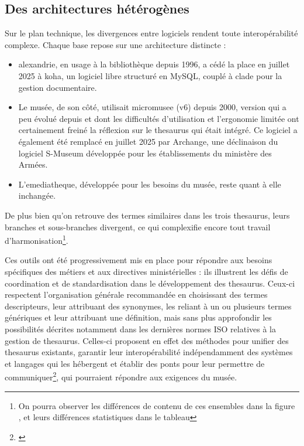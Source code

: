\subsection{Des architectures hétérogènes}

Sur le plan technique, les divergences entre logiciels rendent toute interopérabilité complexe. Chaque base repose sur une architecture distincte :
\begin{itemize}
	\item \gls{alexandrie}, en usage à la bibliothèque depuis 1996, a cédé la place en juillet 2025 à \gls{koha}, un logiciel libre structuré en MySQL, couplé à \gls{clade} pour la gestion documentaire.
	\item Le musée, de son côté, utilisait \gls{micromusee} (v6) depuis 2000, version qui a peu évolué depuis et dont les difficultés d'utilisation et l'ergonomie limitée ont certainement freiné la réflexion sur le \gls{thesaurus} qui était intégré. Ce logiciel a également été remplacé en juillet 2025 par Archange, une déclinaison du logiciel S-Museum développée pour les établissements du ministère des Armées.
	\item L'\gls{emediatheque}, développée pour les besoins du musée, reste quant à elle inchangée.
\end{itemize}

De plus bien qu'on retrouve des termes similaires dans les trois \gls{thesaurus}, leurs branches et sous-branches divergent, ce qui complexifie encore tout travail d'harmonisation\footnote{On pourra observer les différences de contenu de ces ensembles dans la figure , et leurs différences statistiques dans le tableau }.


\bigskip

Ces outils ont été progressivement mis en place pour répondre aux besoins spécifiques des métiers et aux directives ministérielles : ils illustrent les défis de coordination et de standardisation dans le développement des \gls{thesaurus}. Ceux-ci respectent l'organisation générale recommandée en choisissant des termes descripteurs, leur attribuant des synonymes, les reliant à un ou plusieurs termes génériques et leur attribuant une définition, mais sans plus approfondir les possibilités décrites notamment dans les dernières normes ISO relatives à la gestion de \gls{thesaurus}. Celles-ci proposent en effet des méthodes pour unifier des \gls{thesaurus} existants, garantir leur interopérabilité indépendamment des systèmes et langages qui les hébergent et établir des ponts pour leur permettre de communiquer\footnote{\cite{chichereauNormesConceptionGestion2007}}, qui pourraient répondre aux exigences du musée.


